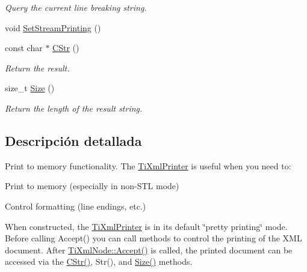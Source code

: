 \begin{DoxyCompactItemize}
\begin{DoxyCompactList}\small\item\em Query the current line breaking string. \end{DoxyCompactList}\item 
void \hyperlink{class_ti_xml_printer_ab23a90629e374cb1cadca090468bbd19}{Set\-Stream\-Printing} ()
\item 
\hypertarget{class_ti_xml_printer_a859eede9597d3e0355b77757be48735e}{const char $\ast$ \hyperlink{class_ti_xml_printer_a859eede9597d3e0355b77757be48735e}{C\-Str} ()}\label{class_ti_xml_printer_a859eede9597d3e0355b77757be48735e}

\begin{DoxyCompactList}\small\item\em Return the result. \end{DoxyCompactList}\item 
\hypertarget{class_ti_xml_printer_ad01375ae9199bd2f48252eaddce3039d}{size\-\_\-t \hyperlink{class_ti_xml_printer_ad01375ae9199bd2f48252eaddce3039d}{Size} ()}\label{class_ti_xml_printer_ad01375ae9199bd2f48252eaddce3039d}

\begin{DoxyCompactList}\small\item\em Return the length of the result string. \end{DoxyCompactList}\end{DoxyCompactItemize}


\subsection{Descripción detallada}
Print to memory functionality. The \hyperlink{class_ti_xml_printer}{Ti\-Xml\-Printer} is useful when you need to\-:


\begin{DoxyEnumerate}
\item Print to memory (especially in non-\/\-S\-T\-L mode)
\item Control formatting (line endings, etc.)
\end{DoxyEnumerate}

When constructed, the \hyperlink{class_ti_xml_printer}{Ti\-Xml\-Printer} is in its default \char`\"{}pretty printing\char`\"{} mode. Before calling Accept() you can call methods to control the printing of the X\-M\-L document. After \hyperlink{class_ti_xml_node_acc0f88b7462c6cb73809d410a4f5bb86}{Ti\-Xml\-Node\-::\-Accept()} is called, the printed document can be accessed via the \hyperlink{class_ti_xml_printer_a859eede9597d3e0355b77757be48735e}{C\-Str()}, Str(), and \hyperlink{class_ti_xml_printer_ad01375ae9199bd2f48252eaddce3039d}{Size()} methods.

